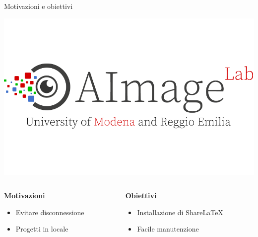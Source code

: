 \documentclass[aspectratio=169]{beamer}
\begin{document}
\begin{frame}{Motivazioni e obiettivi}
    \begin{center}
        \vspace{-2cm}
        \includegraphics[scale=1.5]{img/aimagelab_logo.png}
    \end{center}
    \vspace{-1.5cm}
    \begin{columns}[T]
        \begin{column}{0.5\textwidth}
            \textbf{Motivazioni}
            \begin{itemize}
                \item Evitare disconnessione
                \item Progetti in locale
            \end{itemize}
        \end{column}
        \begin{column}{0.5\textwidth}
            \textbf{Obiettivi}
            \begin{itemize}
                \item Installazione di ShareLaTeX
                \item Facile manutenzione
            \end{itemize}
        \end{column}
    \end{columns}
\end{frame}
\end{document}
